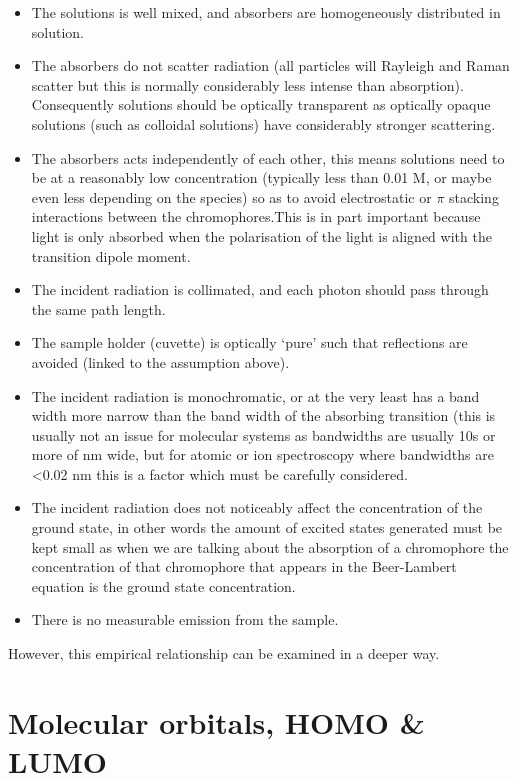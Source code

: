 \documentclass[
]{book}
\providecommand{\tightlist}{%
  \setlength{\itemsep}{0pt}\setlength{\parskip}{0pt}}
\begin{document}
\begin{itemize}
\tightlist
\item
  The solutions is well mixed, and absorbers are homogeneously distributed in solution.
\item
  The absorbers do not scatter radiation (all particles will Rayleigh and Raman scatter but this is normally considerably less intense than absorption). Consequently solutions should be optically transparent as optically opaque solutions (such as colloidal solutions) have considerably stronger scattering.
\item
  The absorbers acts independently of each other, this means solutions need to be at a reasonably low concentration (typically less than 0.01 M, or maybe even less depending on the species) so as to avoid electrostatic or \(\pi\) stacking interactions between the chromophores.This is in part important because light is only absorbed when the polarisation of the light is aligned with the transition dipole moment.
\item
  The incident radiation is collimated, and each photon should pass through the same path length.
\item
  The sample holder (cuvette) is optically `pure' such that reflections are avoided (linked to the assumption above).
\item
  The incident radiation is monochromatic, or at the very least has a band width more narrow than the band width of the absorbing transition (this is usually not an issue for molecular systems as bandwidths are usually 10s or more of nm wide, but for atomic or ion spectroscopy where bandwidths are \textless0.02 nm this is a factor which must be carefully considered.
\item
  The incident radiation does not noticeably affect the concentration of the ground state, in other words the amount of excited states generated must be kept small as when we are talking about the absorption of a chromophore the concentration of that chromophore that appears in the Beer-Lambert equation is the ground state concentration.
\item
  There is no measurable emission from the sample.
\end{itemize}

However, this empirical relationship can be examined in a deeper way.

\hypertarget{sec:MOs}{%
\section{Molecular orbitals, HOMO \& LUMO}\label{sec:MOs}}
\end{document}
